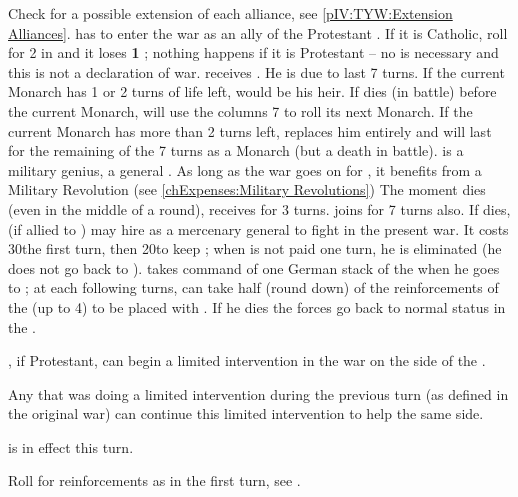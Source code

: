 
\phevnt
\aparag Check for a possible extension of each alliance, see
\ref{pIV:TYW:Extension Alliances}.
\aparag \SUE has to enter the war as an ally of the Protestant \alliance.  If
it is Catholic, roll for 2 \REVOLT in \SUE and it loses {\bf 1} \STAB ;
nothing happens if it is Protestant -- no \CB is necessary and this is not a
declaration of war.
 \SUE receives . He is
due to last 7 turns.
\bparag If the current Monarch has 1 or 2 turns of life left,
 would be his heir. If 
dies (in battle) before the current Monarch, \SUE will use the columns 7 to
roll its next Monarch.
\bparag If the current Monarch has more than 2 turns left,  replaces him entirely and will last for the remaining of the 7
turns as a Monarch (but a death in battle).
\bparag {} is a military genius, a general
. As long as the war goes on for \SUE, it
benefits from a Military Revolution (see \ref{chExpenses:Military
  Revolutions})
\bparag[] [BLP] The moment  dies (even in the middle
of a round), \SUE receives  for 3 turns.
\label{pIV:TYW:Saxe-Weimar}
 joins \SUE for 7 turns also.
\bparag If  dies, \FRA (if allied to \SUE) may hire
 as a mercenary general to fight in the present war.  It
costs 30\ducats the first turn, then 20\ducats to keep ;
when  is not paid one turn, he is eliminated (he does not
go back to \SUE).  takes command of one German stack of
the \alliance when he goes to \FRA; at each following turns, \FRA can take
half (round down) of the reinforcements of the \alliance (up to 4\LD) to be
placed with .  If he dies the forces go back to normal
status in the \alliance.

\aparag \FRA, if Protestant, can begin a limited intervention in the war on
the side of the \alliance.

\aparag Any \MAJ that was doing a limited intervention during the previous
turn (as defined in the original war) can continue this limited intervention
to help the same side.

\aparag {} is in effect this turn.

\phadm
\aparag Roll for reinforcements as in the first turn, see
.

